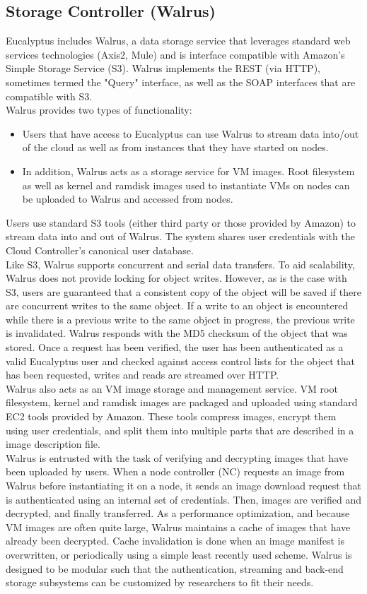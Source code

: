 \subsection{Storage Controller (Walrus)}
Eucalyptus includes Walrus, a data storage service that leverages standard web services technologies (Axis2, Mule) and is interface 
compatible with Amazon's Simple Storage Service (S3). Walrus implements the REST (via HTTP), sometimes termed the "Query" interface, 
as well as the SOAP interfaces that are compatible with S3.\\
Walrus provides two types of functionality:
\begin{itemize}
  \item Users that have access to Eucalyptus can use Walrus to stream data into/out of the cloud as well as from instances that they 
  have started on nodes.
  \item In addition, Walrus acts as a storage service for VM images. Root filesystem as well as kernel and ramdisk images used to 
  instantiate VMs on nodes can be uploaded to Walrus and accessed from nodes.
\end{itemize}
Users use standard S3 tools (either third party or those provided by Amazon) to stream data into and out of Walrus. The system shares 
user credentials with the Cloud Controller’s canonical user database.\\
Like S3, Walrus supports concurrent and serial data transfers. To aid scalability, Walrus does not provide locking for object writes. 
However, as is the case with S3, users are guaranteed that a consistent copy of the object will be saved if there are concurrent 
writes to the same object. If a write to an object is encountered while there is a previous write to the same object in progress, 
the previous write is invalidated. Walrus responds with the MD5 checksum of the object that was stored. Once a request has been verified, 
the user has been authenticated as a valid Eucalyptus user and checked against access control lists for the object that has been 
requested, writes and reads are streamed over HTTP.\\
Walrus also acts as an VM image storage and management service. VM root filesystem, kernel and ramdisk images are packaged and uploaded 
using standard EC2 tools provided by Amazon. These tools compress images, encrypt them using user credentials, and split them into 
multiple parts that are described in a image description file.\\ 
Walrus is entrusted with the task of verifying and decrypting images 
that have been uploaded by users. When a node controller (NC) requests an image from Walrus before instantiating it on a node, it 
sends an image download request that is authenticated using an internal set of credentials. Then, images are verified and decrypted, 
and finally transferred. As a performance optimization, and because VM images are often quite large, Walrus maintains a cache of images 
that have already been decrypted. Cache invalidation is done when an image manifest is overwritten, or periodically using a simple 
least recently used scheme. Walrus is designed to be modular such that the authentication, streaming and back-end storage 
subsystems can be customized by researchers to fit their needs.
